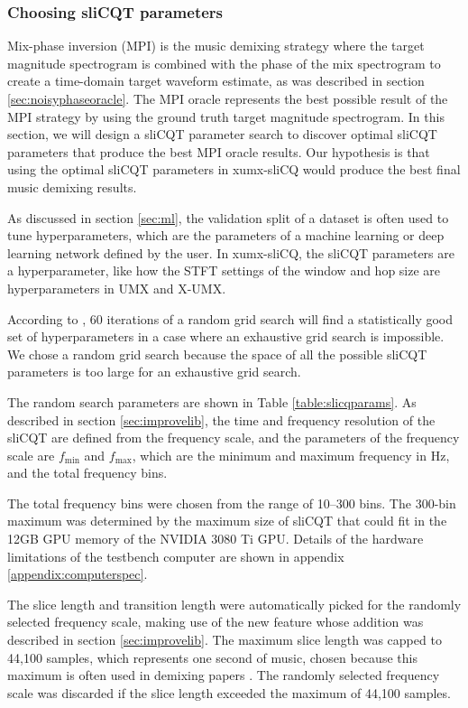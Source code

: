 \documentclass[report.tex]{subfiles}
\begin{document}
\newpagefill

\subsubsection{Choosing sliCQT parameters}
\label{sec:slicqparamsrch}

Mix-phase inversion (MPI) is the music demixing strategy where the target magnitude spectrogram is combined with the phase of the mix spectrogram to create a time-domain target waveform estimate, as was described in section \ref{sec:noisyphaseoracle}. The MPI oracle represents the best possible result of the MPI strategy by using the ground truth target magnitude spectrogram. In this section, we will design a sliCQT parameter search to discover optimal sliCQT parameters that produce the best MPI oracle results. Our hypothesis is that using the optimal sliCQT parameters in xumx-sliCQ would produce the best final music demixing results.

As discussed in section \ref{sec:ml}, the validation split of a dataset is often used to tune hyperparameters, which are the parameters of a machine learning or deep learning network defined by the user. In xumx-sliCQ, the sliCQT parameters are a hyperparameter, like how the STFT settings of the window and hop size are hyperparameters in UMX and X-UMX.

According to \textcite{randomgrid}, 60 iterations of a random grid search will find a statistically good set of hyperparameters in a case where an exhaustive grid search is impossible. We chose a random grid search because the space of all the possible sliCQT parameters is too large for an exhaustive grid search.

The random search parameters are shown in Table \ref{table:slicqparams}. As described in section \ref{sec:improvelib}, the time and frequency resolution of the sliCQT are defined from the frequency scale, and the parameters of the frequency scale are $f_{\text{min}}$ and $f_{\text{max}}$, which are the minimum and maximum frequency in Hz, and the total frequency bins.

The total frequency bins were chosen from the range of 10--300 bins. The 300-bin maximum was determined by the maximum size of sliCQT that could fit in the 12GB GPU memory of the NVIDIA 3080 Ti GPU. Details of the hardware limitations of the testbench computer are shown in appendix \ref{appendix:computerspec}.

The slice length and transition length were automatically picked for the randomly selected frequency scale, making use of the new feature whose addition was described in section \ref{sec:improvelib}. The maximum slice length was capped to 44,100 samples, which represents one second of music, chosen because this maximum is often used in demixing papers \parencite{plumbley1, plumbley2, demucs}. The randomly selected frequency scale was discarded if the slice length exceeded the maximum of 44,100 samples.
\end{document}
